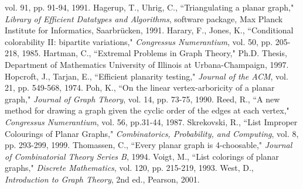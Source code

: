 \documentclass[letterpaper, 12pt]{article}
\theoremstyle{definition}
\theoremstyle{definition}
\theoremstyle{thm}
\theoremstyle{definition}
\begin{document}
\begin{thebibliography}{99}
    vol. 91, pp. 91-94, 1991.
	Hagerup, T., Uhrig, C., ``Triangulating a planar graph," \textit{Library of
	Efficient Datatypes and Algorithms}, software package, Max Planck Institute
	for Informatics, Saarbr{\"u}cken, 1991.
	Harary, F., Jones, K., ``Conditional colorability II: bipartite variations,"
	\textit{Congressus Numerantium}, vol. 50, pp. 205-218, 1985.
	Hartman, C.,
	``Extremal Problems in Graph Theory," Ph.D. Thesis, Department of
	Mathematics University of Illinois at Urbana-Champaign, 1997.
	Hopcroft, J., Tarjan, E., ``Efficient planarity testing," \textit{Journal of
	the ACM}, vol. 21, pp. 549-568, 1974.
	Poh, K., ``On the linear vertex-arboricity of a planar graph,"
	\emph{Journal of Graph Theory}, vol. 14, pp. 73-75, 1990.
	Reed, R., ``A new method for drawing a graph given the cyclic order of the
	edges at each vertex," \textit{Congressus Numerantium}, vol. 56, pp.31-44,
	1987.
	Skrekovski, R., ``List Improper Colourings of Planar Graphs,"
	\textit{Combinatorics, Probability, and Computing}, vol. 8, pp. 293-299,
	1999.
	Thomassen, C., ``Every planar graph is 4-choosable,"
	\emph{Journal of Combinatorial Theory Series B}, 1994.
	Voigt, M., ``List colorings of planar graphs,"
	\textit{Discrete Mathematics}, vol. 120, pp. 215-219, 1993.
	West, D., \textit{Introduction to Graph Theory},
	2nd ed., Pearson, 2001.
\end{thebibliography}

\begin{comment}
\appendix
\section{Code}
\subsection{Poh with breadth first search (4.2)}

\subsection{Poh with face tracing (4.3, 4.4)}

\subsection{Hartman-Skrekovski (5.3, 5.4)}

\subsection{Embedding helper functions}

\subsection{Disjoint set structure}

\end{comment}
\end{document}
